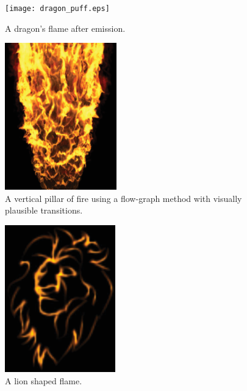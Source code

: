 \documentclass[11pt,twocolumn]{article}
\begin{document}
	\pagebreak
	
	\begin{figure}[h!]
		\caption{A dragon's flame after emission.}
		\label{dragon_puff}
	 	\centering
	 		\texttt{[image: dragon\_puff.eps]}
	\end{figure}
	\begin{figure}[h!]
		\caption{A vertical pillar of fire using a flow-graph method with visually plausible transitions.}
		\label{firecone}
		\centering
			\includegraphics[height=2.5in]{firecone.eps}
	\end{figure}
	\begin{figure}[h!]
		\caption{A lion shaped flame.}
		\label{lion}
		\centering
			\includegraphics[height=2.5in]{lion.eps}
	\end{figure}
	
	\clearpage
	
	
\end{document}
